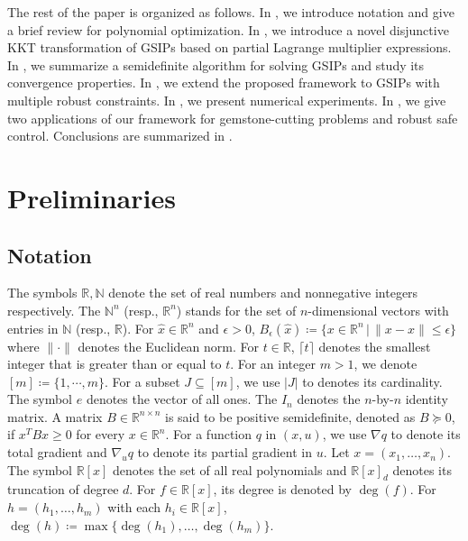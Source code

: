 \documentclass{amsart}
\theoremstyle{plain}
\newcommand{\re}{\mathbb{R}}
\newcommand{\N}{\mathbb{N}}
\numberwithin{equation}{section}
\begin{document}
		The rest of the paper is organized as follows.
		In , we introduce notation and give a brief review for
		polynomial optimization.
		In , we introduce a novel disjunctive KKT transformation of 
		GSIPs based on partial Lagrange multiplier expressions. 
		In , we summarize a semidefinite algorithm for solving GSIPs
        and study its convergence properties.
		In , we extend the proposed framework to GSIPs with multiple 
		robust constraints.
		In , we present numerical experiments.
            In , we give two applications of our framework 
            for gemstone-cutting problems and robust safe control.
		Conclusions are summarized in .
	
	\section{Preliminaries}\label{sec:pre}
	\subsection*{Notation}	
	The symbols $\re,\N$ denote the set of real numbers and nonnegative integers 
	respectively. The $\mathbb{N}^n$ (resp., $\mathbb{R}^n$) stands for the set 
	of $n$-dimensional vectors with entries in $\mathbb{N}$ (resp., $\mathbb{R}$).
	For $\hat{x}\in\re^n$ and $\epsilon>0$, 
	$B_{\epsilon}(\hat{x})\coloneqq\{x\in\re^n\,\vert\, \|x-\hat{x}\|\le \epsilon\}$
	where $\|\cdot\|$ denotes the Euclidean norm.
	For $t\in \re$, $\lceil t\rceil$ denotes the smallest integer that is greater
	than or equal to $t$.
	For an integer $m>1$, we denote $[m] \coloneqq \{1,\cdots,m\}$.
    For a subset $J\subseteq[m]$, we use $|J|$ to denotes its cardinality.
	The symbol $e$ denotes the vector of all ones.
	The $I_n$ denotes the $n$-by-$n$ identity matrix.
	A matrix $B\in\re^{n\times n}$ is said to be positive semidefinite, 
	denoted as $B\succeq 0$, if $x^TB x\ge 0$ for every $x\in\re^n$.
	For a function $q$ in $(x,u)$, we use $\nabla q$ to denote its total gradient and 
	$\nabla_u q$ to denote its partial gradient in $u$.
	Let $x = (x_1,\ldots, x_n)$. 
	The symbol $\re[x]$ denotes the set of all real polynomials and 
	$\re[x]_d$ denotes its truncation of degree $d$. 
	For $f\in\re[x]$, its degree is denoted by $\deg(f)$. 
	For $h = (h_1,\ldots, h_m)$ with each $h_i\in\re[x]$, 
	$\deg(h)\coloneqq\max\{\deg(h_1),\ldots, \deg(h_m)\}$.
	
	
	
\end{document}
